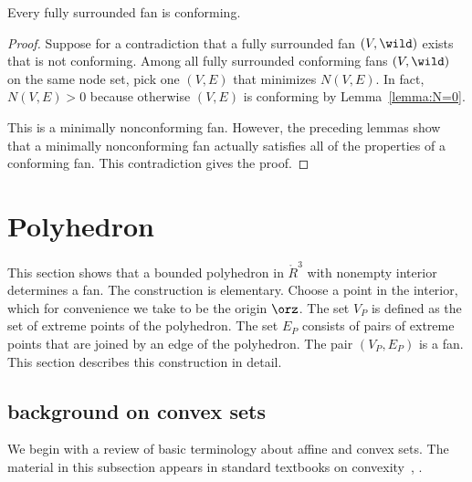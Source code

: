 %


\begin{lemma}[conformance]\label{lemma:face}
Every fully surrounded fan is conforming.
\end{lemma}

\begin{proof}
Suppose for a contradiction that a fully surrounded fan $(V,\wild )$
exists that is not conforming.  Among all fully surrounded
conforming fans $(V,\wild )$ on the same node set, pick one $(V,E)$
that minimizes $N(V,E)$.  In fact, $N(V,E)>0$ because otherwise $(V,E)$
is conforming by Lemma~\ref{lemma:N=0}.

This is a minimally nonconforming fan.  However, the preceding lemmas show
that a minimally nonconforming fan actually satisfies all of the properties
of a conforming fan.   This contradiction gives the proof.
\end{proof}



\section{Polyhedron}\label{sec:poly}

This section shows that a bounded polyhedron in $\ring{R}^3$ with
nonempty interior determines a fan.  The construction is elementary.
Choose a point in the interior, which for convenience we take to be
the origin $\orz$.  The set $V_P$ is defined as the set of extreme
points of the polyhedron.  The set $E_P$ consists of pairs of extreme
points that are joined by an edge of the polyhedron.  The pair
$(V_P,E_P)$ is a fan.  This section describes this construction in
 detail.



\subsection{background on convex sets}

We begin with a review of basic terminology about affine and convex
sets.  The material in this subsection appears in standard textbooks
on convexity~\cite{barvinok:2002}, \cite{webster:1994}.

